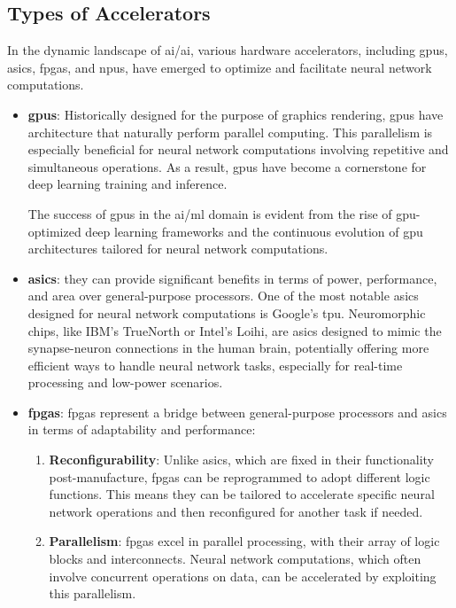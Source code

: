 \subsection{Types of Accelerators}

In the dynamic landscape of \gls{ai}/\gls{ai}, various hardware accelerators, including \glspl{gpu}, \glspl{asic}, \glspl{fpga}, and \glspl{npu}, have emerged to optimize and facilitate neural network computations.
\begin{itemize}
	\item \textbf{\glspl{gpu}}: Historically designed for the purpose of graphics rendering, \glspl{gpu} have architecture that naturally perform parallel computing. This parallelism is especially beneficial for neural network computations involving repetitive and simultaneous operations. As a result, \glspl{gpu} have become a cornerstone for deep learning training and inference.
	
	The success of \glspl{gpu} in the \gls{ai}/\gls{ml} domain is evident from the rise of \gls{gpu}-optimized deep learning frameworks and the continuous evolution of \gls{gpu} architectures tailored for neural network computations.
	
	
	\item \textbf{\glspl{asic}}: they can provide significant benefits in terms of power, performance, and area over general-purpose processors. One of the most notable \glspl{asic} designed for neural network computations is Google's \gls{tpu}. Neuromorphic chips, like IBM's TrueNorth or Intel's Loihi, are \glspl{asic} designed to mimic the synapse-neuron connections in the human brain, potentially offering more efficient ways to handle neural network tasks, especially for real-time processing and low-power scenarios.
	
	\item \textbf{\glspl{fpga}}: \glspl{fpga} represent a bridge between general-purpose processors and \glspl{asic} in terms of adaptability and performance:
	
	\begin{enumerate}
		\item \textbf{Reconfigurability}: Unlike \glspl{asic}, which are fixed in their functionality post-manufacture, \glspl{fpga} can be reprogrammed to adopt different logic functions. This means they can be tailored to accelerate specific neural network operations and then reconfigured for another task if needed.
		
		\item \textbf{Parallelism}: \glspl{fpga} excel in parallel processing, with their array of logic blocks and interconnects. Neural network computations, which often involve concurrent operations on data, can be accelerated by exploiting this parallelism.
		

\end{enumerate}
\end{itemize}
